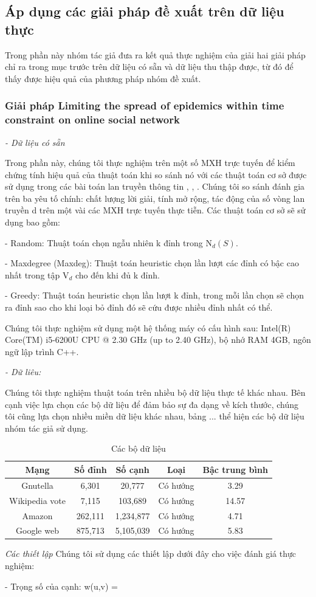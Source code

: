 	\subsection{ Áp dụng các giải pháp đề xuất trên dữ liệu thực}
	Trong phần này nhóm tác giả đưa ra kết quả thực nghiệm của giải hai giải pháp chỉ ra trong mục trước trên dữ liệu có sẵn và dữ liệu thu thập được, từ đó để thấy được hiệu quả của phương pháp nhóm đề xuất.
		
		\subsubsection{Giải pháp Limiting the spread of epidemics within time constraint on online social network}
		{\itshape - Dữ liệu có sẵn}
		
		Trong phần này, chúng tôi thực nghiệm trên một số MXH trực tuyến để kiểm chứng tính hiệu quả của thuật toán khi so sánh nó với các thuật toán cơ sở được sử dụng trong các bài toán lan truyền thông tin \cite{nguyen30}, \cite{kempe21}, \cite{zhang40}. Chúng tôi so sánh đánh gia trên ba yêu tố chính: chất lượng lời giải, tính mở rộng, tác động của số vòng lan truyền d trên một vài các MXH trực tuyến thực tiễn. Các thuật toán cơ sở sẽ sử dụng bao gồm:
		
		- Random: Thuật toán chọn ngẫu nhiên k đỉnh trong N$_{d}(S)$.
		
		- Maxdegree (Maxdeg): Thuật toán heuristic chọn lần lượt các đỉnh có bậc cao nhất trong tập V$_{d}$ cho đến khi đủ k đỉnh.
		
		- Greedy: Thuật toán heuristic chọn lần lượt k đỉnh, trong mỗi lần chọn sẽ chọn ra đỉnh sao cho khi loại bỏ đỉnh đó sẽ cứu được nhiều đỉnh nhất có thể.
		
		Chúng tôi thực nghiệm sử dụng một hệ thống máy có cấu hình sau: Intel(R) Core(TM) i5-6200U CPU @ 2.30 GHz (up to 2.40 GHz), bộ nhớ RAM 4GB, ngôn ngữ lập trình C++.
		
		{\itshape - Dữ liêu:}
		
		 Chúng tôi thực nghiệm thuật toán trên nhiều bộ dữ liệu thực tế khác nhau. Bên cạnh việc lựa chọn các bộ dữ liệu để đảm bảo sự đa dạng về kích thước, chúng tôi cũng lựa chọn nhiều miền dữ liệu khác nhau, bảng ... thể hiện các bộ dữ liệu nhóm tác giả sử dụng.
		\begin{table}
			\centering
			\begin{tabular}{|c|c|c|c|c|}
				\hline 
				Mạng & Số đỉnh & Số cạnh & Loại & Bậc trung bình \\ 
				\hline 
				Gnutella & 6,301 & 20,777 & Có hướng & 3.29 \\ 
				\hline 
				Wikipedia vote & 7,115 & 103,689 & Có hướng & 14.57 \\ 
				\hline 
				Amazon & 262,111 & 1,234,877 & Có hướng & 4.71 \\ 
				\hline 
				Google web & 875,713 & 5,105,039 & Có hướng & 5.83 \\ 
				\hline 
			\end{tabular} 
			\caption{Các bộ dữ liệu}
		\end{table}
		
		{\itshape Các thiết lập} Chúng tôi sử dụng các thiết lập dưới đây cho việc đánh giá thực nghiệm:
		
		- Trọng số của cạnh: w(u,v) = 



